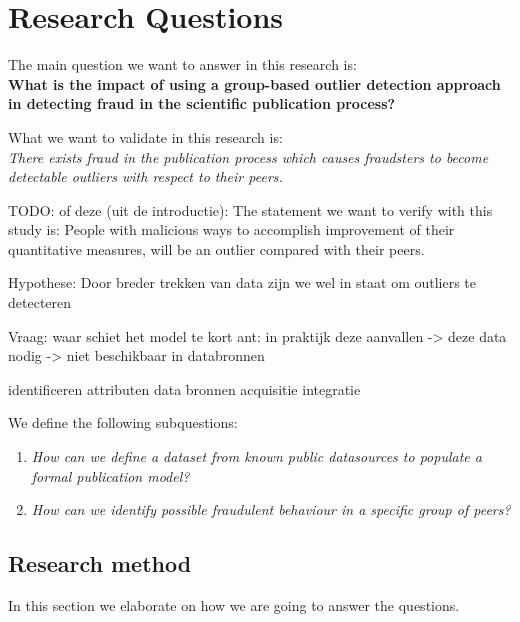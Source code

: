 \documentclass{ou-report}
\newcommand{\todo}[1]{{\color{red} TODO: #1}}
\begin{document}
\section{Research Questions}

The main question we want to answer in this research is: \\
\textbf{What is the impact of using a group-based outlier detection approach in 
detecting fraud in the scientific publication process?}

What we want to validate in this research is: \\
\textit{There exists fraud in the publication process which causes fraudsters
to become detectable outliers with respect to their peers.}

\todo{of deze (uit de introductie):}
The statement we want to verify with this study is:
People with malicious ways to accomplish improvement of their quantitative 
measures, will be an outlier compared with their peers.

Hypothese: Door breder trekken van data zijn we wel in staat om outliers te detecteren

Vraag: waar schiet het model te kort
ant: in praktijk deze aanvallen -> deze data nodig -> niet beschikbaar in databronnen

identificeren attributen
data bronnen
acquisitie
integratie

We define the following subquestions:

\begin{enumerate}[label=RQ\arabic*]

    \item \label{RQ1} \textit{How can we define a dataset from known public 
    datasources to populate a formal publication model?}
    \item \label{RQ2} \textit{How can we identify possible fraudulent behaviour
    in a specific group of peers?}

\end{enumerate}

\subsection{Research method}
\label{Research_ResearchMethod}
In this section we elaborate on how we are going to answer the questions.
\end{document}
